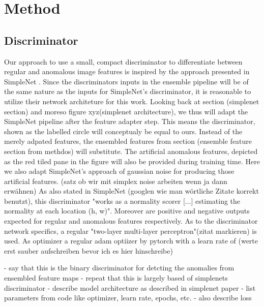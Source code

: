\chapter{Method}
\label{chap:method}


\section{Discriminator}
\label{sec:discriminator}
Our approach to use a small, compact discriminator to differentiate between regular and anomalous image features is inspired by the approach 
presented in SimpleNet \cite{liu2023simplenet}. Since the discriminators inputs in the ensemble pipeline will be of the same nature as 
the inputs for SimpleNet's discriminator, it is reasonable to utilize their network architeture for this work. Looking back at section 
(simplenet section) and moreso figure xyz(simplenet architecture), we thus will adapt the SimpleNet pipeline after the feature adapter step. 
This means the discriminator, shown as the labelled circle will conceptualy be equal to ours. Instead of the merely adpated features, 
the ensembled features from section (ensemble feature section from methdos) will substitute. The artificial anomalous features, 
depicted as the red tiled pane in the figure will also be provided during training time. Here we also adapt SimpleNet's approach of 
gaussian noise for producing those artificial features. (satz ob wir mit simplex noise arbeiten wenn ja dann erwähnen) As also stated in 
SimpleNet (googlen wie man wörtliche Zitate korrekt benutzt), this discriminator "works as a normality scorer [...] estimating the normality 
at each location (h, w)". Moreover are positive and negative outputs expected for regular and anomalous features respectively.
As to the discriminator network specifics, a regular "two-layer multi-layer perceptron"(zitat markieren) is used. As optimizer a regular 
adam optiizer by pytorch with a learn rate of (werte erst sauber aufschreiben bevor ich es hier hinschreibe)



- say that this is the binary discriminator for detcting the anomalies from ensembled feature maps
- repeat that this is largely based of simplenets discriminator
- describe model architecture as described in simplenet paper
- list parameters from code like optimizer, learn rate, epochs, etc. 
- also describe loss


